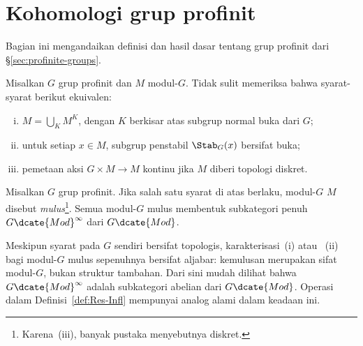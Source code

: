 
\section{Kohomologi grup profinit}\label{sec:profinite-cohomology}
\hypertarget{o014.aljabr2.chapter6.profinite-cohomology-a}{ }

Bagian ini mengandaikan definisi dan hasil dasar tentang grup profinit dari
\S\ref{sec:profinite-groups}.

Misalkan $G$ grup profinit dan $M$ modul-$G$. Tidak sulit memeriksa bahwa
syarat-syarat berikut ekuivalen:
\begin{enumerate}[(i)]
	\item $M=\bigcup_KM^K$, dengan $K$ berkisar atas subgrup normal buka dari
	$G$;
	\item untuk setiap $x\in M$, subgrup penstabil $\Stab_G(x)$ bersifat buka;
	\item pemetaan aksi $G\times M\to M$ kontinu jika $M$ diberi topologi
	diskret.
\end{enumerate}

\begin{definition}
	Misalkan $G$ grup profinit. Jika salah satu syarat di atas berlaku, modul-$G$
	$M$ disebut \emph{mulus}\footnote{Karena~(iii), banyak pustaka menyebutnya
	diskret.}. Semua modul-$G$ mulus membentuk subkategori penuh
	$G\dcate{Mod}^\infty$ dari $G\dcate{Mod}$.
\end{definition}

Meskipun syarat pada $G$ sendiri bersifat topologis, karakterisasi~(i) atau
~(ii) bagi modul-$G$ mulus sepenuhnya bersifat aljabar: kemulusan merupakan sifat
modul-$G$, bukan struktur tambahan. Dari sini mudah dilihat bahwa
$G\dcate{Mod}^\infty$ adalah subkategori abelian dari $G\dcate{Mod}$. Operasi
dalam Definisi~\ref{def:Res-Infl} mempunyai analog alami dalam keadaan ini.

